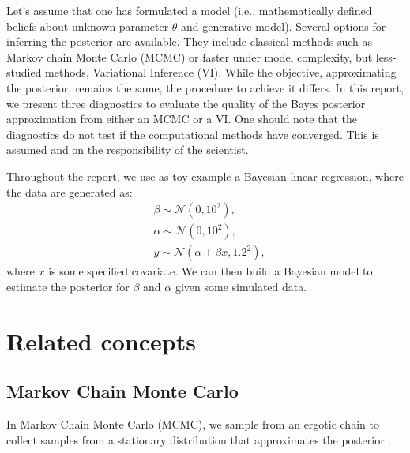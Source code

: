 \documentclass[twoside]{article}
\begin{document}
Let's assume that one has formulated a model (i.e., mathematically defined beliefs about unknown parameter $\theta$ and generative model). Several options for inferring the posterior are available. They include classical methods such as Markov chain Monte Carlo (MCMC) or faster under model complexity, but less-studied methods, Variational Inference (VI). While the objective, approximating the posterior, remains the same, the procedure to achieve it differs. In this report, we present three diagnostics to evaluate the quality of the Bayes posterior approximation from either an MCMC or a VI. One should note that the diagnostics do not test if the computational methods have converged. This is assumed and on the responsibility of the scientist.

Throughout the report, we use as toy example a Bayesian linear regression, where the data are generated as:
\begin{align}
    & \beta \sim \mathcal{N}(0, 10^2),\\
    & \alpha \sim \mathcal{N}(0, 10^2),\\
    & y \sim \mathcal{N}(\alpha + \beta x, 1.2^2),
\end{align}
where $x$ is some specified covariate. We can then build a Bayesian model to estimate the posterior for $\beta$ and $\alpha$ given some simulated data.



\section{Related concepts}
\subsection{Markov Chain Monte Carlo}
In Markov Chain Monte Carlo (MCMC), we sample from an ergotic chain to collect samples from a stationary distribution that approximates the posterior \citep{Robert:2004}. 
\end{document}
